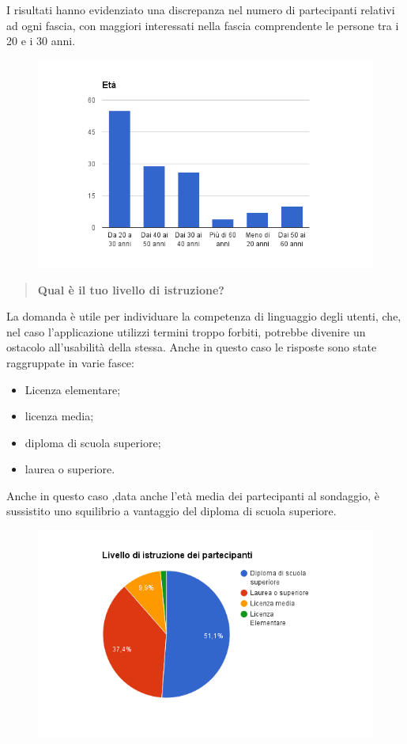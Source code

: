 I risultati hanno evidenziato una discrepanza nel numero di partecipanti
relativi ad ogni fascia, con maggiori interessati nella fascia comprendente le
persone tra i 20 e i 30 anni.

\begin{figure}[H]
	\centering
	\includegraphics[scale=0.6]{img/chart_eta}
\end{figure}

\begin{quote}
	\textbf{Qual è il tuo livello di istruzione?}
\end{quote}
La domanda è utile per individuare la competenza di linguaggio degli utenti,
che, nel caso l'applicazione utilizzi termini troppo forbiti, potrebbe divenire
un ostacolo all'usabilità della stessa.  Anche in questo caso le risposte sono
state raggruppate in varie fasce:

\begin{itemize}
	\item Licenza elementare;
	\item licenza media;
	\item diploma di scuola superiore;
	\item laurea o superiore.
\end{itemize}
Anche in questo caso ,data anche l'età media dei partecipanti al sondaggio, è
sussistito uno squilibrio a vantaggio del diploma di scuola superiore.

\begin{figure}[H]
	\centering
	\includegraphics[scale=0.6]{img/chart_istruzione}
\end{figure}

